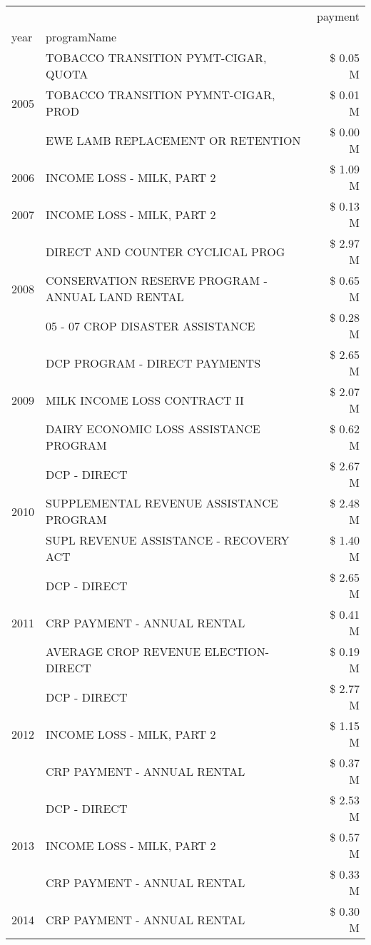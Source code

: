 \begin{tabular}{llr}
\toprule
 &  & payment \\
year & programName &  \\
\midrule
\multirow[t]{3}{*}{2005} & TOBACCO TRANSITION PYMT-CIGAR, QUOTA & \$ 0.05 M \\
 & TOBACCO TRANSITION PYMNT-CIGAR, PROD & \$ 0.01 M \\
 & EWE LAMB REPLACEMENT OR RETENTION & \$ 0.00 M \\
\cline{1-3}
2006 & INCOME LOSS - MILK, PART 2 & \$ 1.09 M \\
\cline{1-3}
2007 & INCOME LOSS - MILK, PART 2 & \$ 0.13 M \\
\cline{1-3}
\multirow[t]{3}{*}{2008} & DIRECT AND COUNTER CYCLICAL PROG & \$ 2.97 M \\
 & CONSERVATION RESERVE PROGRAM - ANNUAL LAND RENTAL & \$ 0.65 M \\
 & 05 - 07 CROP DISASTER ASSISTANCE & \$ 0.28 M \\
\cline{1-3}
\multirow[t]{3}{*}{2009} & DCP PROGRAM - DIRECT PAYMENTS & \$ 2.65 M \\
 & MILK INCOME LOSS CONTRACT II & \$ 2.07 M \\
 & DAIRY ECONOMIC LOSS ASSISTANCE PROGRAM & \$ 0.62 M \\
\cline{1-3}
\multirow[t]{3}{*}{2010} & DCP - DIRECT & \$ 2.67 M \\
 & SUPPLEMENTAL REVENUE ASSISTANCE PROGRAM & \$ 2.48 M \\
 & SUPL REVENUE ASSISTANCE - RECOVERY ACT & \$ 1.40 M \\
\cline{1-3}
\multirow[t]{3}{*}{2011} & DCP - DIRECT & \$ 2.65 M \\
 & CRP PAYMENT - ANNUAL RENTAL & \$ 0.41 M \\
 & AVERAGE CROP REVENUE ELECTION-DIRECT & \$ 0.19 M \\
\cline{1-3}
\multirow[t]{3}{*}{2012} & DCP - DIRECT & \$ 2.77 M \\
 & INCOME LOSS - MILK, PART 2 & \$ 1.15 M \\
 & CRP PAYMENT - ANNUAL RENTAL & \$ 0.37 M \\
\cline{1-3}
\multirow[t]{3}{*}{2013} & DCP - DIRECT & \$ 2.53 M \\
 & INCOME LOSS - MILK, PART 2 & \$ 0.57 M \\
 & CRP PAYMENT - ANNUAL RENTAL & \$ 0.33 M \\
\cline{1-3}
\multirow[t]{3}{*}{2014} & CRP PAYMENT - ANNUAL RENTAL & \$ 0.30 M \\

\end{tabular}
